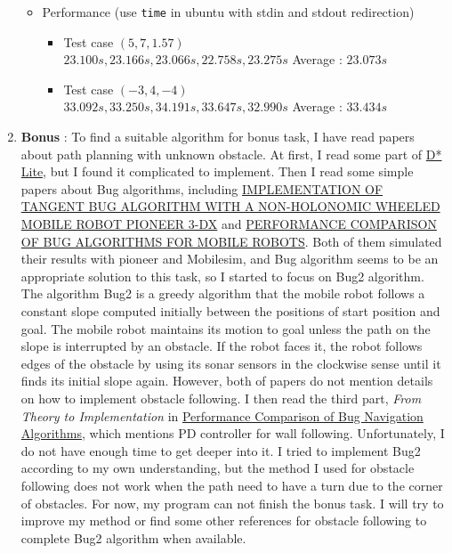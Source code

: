 \documentclass[12pt, a4paper]{article}
\begin{document}
\begin{enumerate}[1.]
\begin{itemize}
\item
Performance (use \texttt{time} in ubuntu with stdin and stdout redirection) 
\begin{itemize} 
\item
Test case $(5, 7, 1.57)$ \\ $23.100 s, 23.166 s, 23.066 s, 22.758 s, 23.275 s$ Average : $23.073 s$ 
\item
Test case $(-3, 4, -4)$ \\ $33.092 s, 33.250 s, 34.191 s, 33.647 s, 32.990 s$ Average : $33.434 s$
\end{itemize}
\end{itemize}
\item 
{\bf Bonus} : To find a suitable algorithm for bonus task, I have read papers about path planning with unknown obstacle. At first, I read some part of \href{http://idm-lab.org/bib/abstracts/papers/aaai02b.pdf}{D* Lite}, but I found it complicated to implement. Then I read some simple papers about Bug algorithms, including \href{http://www.eee.metu.edu.tr/~hturhan/IMPLEMENTATION%20OF%20TANGENT%20BUG%20ALGORITHM.pdf}{IMPLEMENTATION OF TANGENT BUG ALGORITHM WITH A
NON-HOLONOMIC WHEELED MOBILE ROBOT PIONEER 3-DX} and \href{http://iats09.karabuk.edu.tr/press/bildiriler_pdf/iats09_01-01_1254.pdf}{PERFORMANCE COMPARISON OF BUG ALGORITHMS
FOR MOBILE ROBOTS}. Both of them simulated their results with pioneer and Mobilesim, and Bug algorithm seems to be an appropriate solution to this task, so I started to focus on Bug2 algorithm. The algorithm Bug2 is a greedy algorithm that the mobile robot follows a constant slope computed initially between the positions of start position and goal. The mobile robot maintains its motion to goal unless the path on the slope is interrupted by an obstacle. If the robot faces it, the robot follows edges of the obstacle by using its sonar sensors in the clockwise sense until it finds its initial slope again. However, both of papers do not mention details on how to implement obstacle following.  I then read the third part, {\it From Theory to Implementation} in \href{http://link.springer.com/article/10.1007/s10846-007-9157-6}{Performance Comparison of Bug Navigation Algorithms}, which mentions PD controller for wall following. Unfortunately, I do not have enough time to get deeper into it. I tried to implement Bug2 according to my own understanding, but the method I used for obstacle following does not work when the path need to have a turn due to the corner of obstacles. For now, my program can not finish the bonus task. I will try to improve my method or find some other references for obstacle following to complete Bug2 algorithm when available.  
\end{enumerate}
\end{document}
